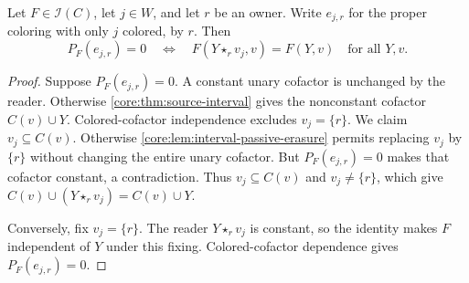 \begin{corollary}
\label{core:cor:source-reader-absorption}
Let $F\in\mathcal I(C)$, let $j\in W$, and let $r$ be an owner.
Write $e_{j,r}$ for the proper coloring with only $j$ colored, by $r$.
Then
\[
 P_F(e_{j,r})=0
 \quad\Longleftrightarrow\quad
 F(Y\star_r v_j,v)=F(Y,v)\quad\text{for all }Y,v.
\]
\end{corollary}
\begin{proof}
Suppose $P_F(e_{j,r})=0$. A constant unary cofactor is unchanged by
the reader. Otherwise \cref{core:thm:source-interval} gives the
nonconstant cofactor $C(v)\cup Y$. Colored-cofactor independence
excludes $v_j=\{r\}$.
We claim $v_j\subseteq C(v)$. Otherwise
\cref{core:lem:interval-passive-erasure} permits replacing $v_j$ by
$\{r\}$ without changing the entire unary cofactor. But $P_F(e_{j,r})=0$ makes that
cofactor constant, a contradiction.
Thus $v_j\subseteq C(v)$ and $v_j\ne\{r\}$,
which give $C(v)\cup(Y\star_r v_j)=C(v)\cup Y$.

Conversely, fix $v_j=\{r\}$. The reader $Y\star_r v_j$ is constant,
so the identity makes $F$ independent of $Y$ under this fixing.
Colored-cofactor dependence gives $P_F(e_{j,r})=0$.
\end{proof}

